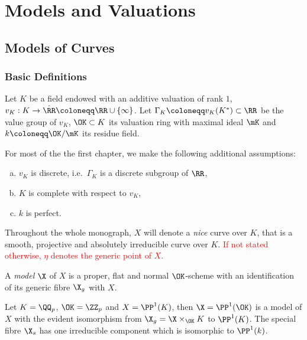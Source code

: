 

\chapter{Models and Valuations}\label{ch:models-and-valuations}

\section{Models of Curves}\label{sec:models-of-curves}

\subsection{Basic Definitions}\label{subsec:basic-definitions}
Let $K$ be a field endowed with an additive valuation of rank $1$, $v_K: K \to \hat{\RR} \coloneqq \RR\cup \lbrace\infty\rbrace$.
Let $\Gamma_K \coloneqq v_K(K^*) \subset \RR$ be the value group of $v_K$, $\OK \subset K$ its valuation ring with
maximal ideal $\mK$ and $k \coloneqq \OK /\mK$ its residue field.

For most of the the first chapter, we make the following additional assumptions:
\begin{assumption} \label{ass:v_K}
    \begin{enumerate}[(a)]
        \item $v_K$ is discrete, i.e.\ $\Gamma_K$ is a discrete subgroup of $\RR$,
        \item $K$ is complete with respect to $v_K$,
        \item $k$ is perfect.
    \end{enumerate}
\end{assumption}

Throughout the whole monograph, $X$ will denote a \textit{nice} curve over $K$,
that is a smooth, projective and absolutely irreducible curve over $K$.
\textcolor{red}{If not stated otherwise, $\eta$ denotes the generic point of $X$.}

\begin{definition} \label{def:model}
    A \textit{model} $\X$ of $X$ is a proper, flat and normal $\OK $-scheme
    with an identification of its generic fibre $\X_g$ with $X$.
\end{definition}

\begin{example}
    Let $K = \QQ_p$, $\OK  = \ZZ_p$ and $X = \PP^1(K)$, then $\X = \PP^1(\OK )$ is a model of $X$ with the
    evident isomorphism from $\X_g = \X \times_{\OK} K$ to $\PP^1(K)$.
    The special fibre $\X_s$ has one irreducible component which is isomorphic to $\PP^1(k)$.
\end{example}

